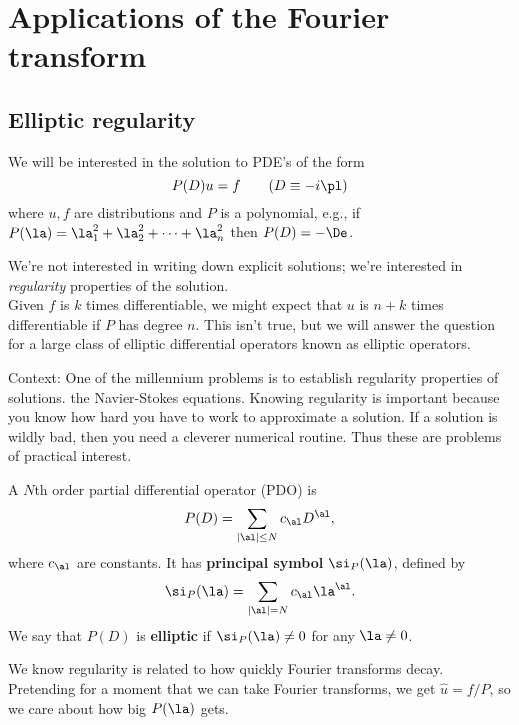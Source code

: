 \chapter{Applications of the Fourier transform }

\section{Elliptic regularity}
We will be interested in the solution to PDE's of the form
\[
P(D)u=f\qquad (D\equiv -i\pl)
\]
where $u,f$ are distributions and $P$ is a polynomial, e.g., if $P(\la)=\la_1^2+\la_2^2+\cdots +\la_n^2$ then $P(D)=-\De$.

We're not interested in writing down explicit solutions; we're interested in {\it regularity} properties of the solution. \\

\vskip0.15in
Given $f$ is $k$ times differentiable, we might expect that $u$ is $n+k$ times differentiable if $P$ has degree $n$. This isn't true, but we will answer the question for a large class of elliptic differential operators known as elliptic operators.

Context: One of the millennium problems is to establish regularity properties of solutions. the Navier-Stokes equations. Knowing regularity is important because you know how hard you have to work to approximate a solution. If a solution is wildly bad, then you need a cleverer numerical routine. Thus these are problems of practical interest.

\begin{df}
A $N$th order partial differential operator (PDO) is
\[
P(D)=\sum_{|\al|\le N}c_{\al}D^{\al}, %
\]
where $c_\al$ are constants. It has \textbf{principal symbol} $\si_P(\la)$, defined by 
\[
\si_P(\la)=\sum_{|\al|=N}c_{\al}\la^{\al}.
\]
We say that $P(D)$ is \textbf{elliptic} if $\si_P(\la)\ne 0$ for any $\la\ne 0$.
\end{df}
We know regularity is related to how quickly Fourier transforms decay.  Pretending for a moment that we can take Fourier transforms, we get $\hat u=f/P$, so we care about how big $P(\la)$ gets. 

